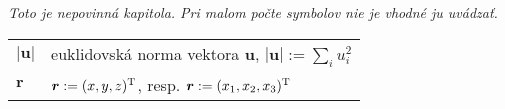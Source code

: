 
\begin{center}
{\it Toto je nepovinná kapitola. Pri malom počte symbolov nie je vhodné ju uvádzať.}

   \begin{tabular}{lp{.8\linewidth}}
     $|\boldsymbol{u}|$  & euklidovská norma vektora $\boldsymbol{u}$, $|\boldsymbol{u}|:=\sum_i u_i^2$ \\ [3pt]
     $\boldsymbol{r}$     & $\boldsymbol{r}:=(x,y,z)^{\rm{T}}$, resp. $\boldsymbol{r}:=(x_1,x_2,x_3)^{\rm{T}}$
   \end{tabular}
\end{center}
